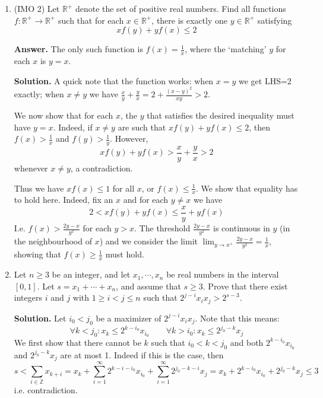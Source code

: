 \documentclass[11pt,a4paper]{article}
\begin{document}
\begin{enumerate}
		\item[A3.] (IMO 2)
		Let $\mathbb{R}^+$ denote the set of positive real numbers. Find all functions $f: \mathbb{R}^+ \to \mathbb{R}^+$ such that for each $x \in \mathbb{R}^+$, there is exactly one $y \in \mathbb{R}^+$ satisfying$$xf(y)+yf(x) \leq 2$$
		
		\textbf{Answer.} The only such function is $f(x) = \frac 1x$, where the `matching' $y$ for each $x$ is $y = x$. 
		
		\textbf{Solution.} 
		A quick note that the function works: when $x=y$ we get LHS=2 exactly; 
		when $x\neq y$ we have $\frac{x}{y}+\frac{y}{x} = 2 + \frac{(x-y)^2}{xy} > 2$. 
		
		We now show that for each $x$, the $y$ that satisfies the desired inequality must have $y = x$. 
		Indeed, if $x\neq y$ are such that $xf(y)+yf(x) \leq 2$, 
		then $f(x) > \frac 1x$ and $f(y) > \frac 1y$. 
		However, 
		\[
		xf(y)+yf(x) > \frac xy + \frac yx > 2
		\]
		whenever $x\neq y$, a contradiction. 
		
		Thus we have $xf(x)\le 1$ for all $x$, or $f(x)\le \frac 1x$. 
		We show that equality has to hold here. 
		Indeed, fix an $x$ and for each $y\neq x$ we have 
		\[
		2 < xf(y) + yf(x) \le \frac xy + yf(x)
		\]
		I.e. $f(x) > \frac{2y - x}{y^2}$ for each $y > x$. 
		The threshold $\frac{2y - x}{y^2}$ is continuous in $y$ (in the neighbourhood of $x$) and we consider the limit 
		$\lim_{y\to x^+} \frac{2y - x}{y^2} = \frac 1x$, 
		showing that $f(x)\ge \frac 1x$ must hold. 
		
		\item[A4.]
		Let $n \ge 3$ be an integer, and let $x_1, \cdots , x_n$ be real numbers in the interval $[0, 1]$. 
		Let $s=x_1+ \cdots +x_n$, and assume that $s\ge 3$. 
		Prove that there exist integers $i$ and $j$ with $1\ge i < j\le n$ such that
		$2^{j - i}x_ix_j > 2^{s - 3}$.
		
		\textbf{Solution.} 
		Let $i_0 < j_0$ be a maximizer of $2^{j-i}x_ix_j$. 
		Note that this means: 
		\[
		\forall k < {j_0}: x_k\le 2^{k -i_0}x_{i_0}
		\qquad 
		\forall k > {i_0}: x_k \le 2^{j_0 - k}x_j
		\]
		We first show that there cannot be $k$ such that $i_0 < k < j_0$ and both $2^{k -i_0}x_{i_0}$ and $2^{j_0 - k}x_j$ are at most 1. 
		Indeed if this is the case, then 
		\[
		s < \sum_{i\in\mathbb{Z}} x_{k + i}
		= x_k + \sum_{i=1}^{\infty} 2^{k - i -i_0}x_{i_0} + \sum_{i=1}^{\infty} 2^{j_0 - k - i}x_j
		= x_k + 2^{k -i_0}x_{i_0} + 2^{j_0 - k}x_j \le 3
		\]
		i.e. contradiction. 
		

\end{enumerate}
\end{document}
